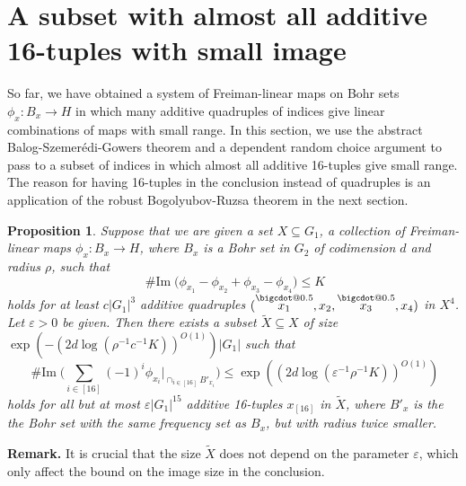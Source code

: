 \documentclass[a4paper,11pt]{article}
\makeatletter
\numberwithin{theorem}{section}
\newtheorem{proposition}[theorem]{Proposition}
\theoremstyle{definition}
\newcommand{\on}[1]{
	\operatorname{#1}
}
\newcommand\range{\on{\# Im}}
\newcommand*\bcdot{\mathpalette\bigcdot@{0.5}}
\newcommand*\bigcdot@[2]{\mathbin{\vcenter{\hbox{\scalebox{#2}{$\m@th#1\bullet$}}}}}
\newcommand{\upd}[1]{\overset{\bcdot}{#1}}
\makeatother
\begin{document}
\section{A subset with almost all additive 16-tuples with small image}\label{almostalladditive16tuplesABSG1}

So far, we have obtained a system of Freiman-linear maps on Bohr sets  $\phi_x : B_x \to H$ in which many additive quadruples of indices give linear combinations of maps with small range. In this section, we use the abstract Balog-Szemer\'edi-Gowers theorem and a dependent random choice argument to pass to a subset of indices in which almost all additive 16-tuples give small range. The reason for having 16-tuples in the conclusion instead of quadruples is an application of the robust Bogolyubov-Ruzsa theorem in the next section.

\begin{proposition}\label{almostalladd16tupleshavesmallimage}
    Suppose that we are given a set $X \subseteq G_1$, a collection of Freiman-linear maps $\phi_x : B_x \to H$, where $B_x$ is a Bohr set in $G_2$ of codimension $d$ and radius $\rho$, such that 
    \[\range\Big(\phi_{x_1} - \phi_{x_2} + \phi_{x_3} - \phi_{x_4}\Big) \leq K\]
    holds for at least $c|G_1|^3$ additive quadruples $(\upd{x_1}, x_2, \upd{x_3}, x_4)$ in $X^4$. Let $\varepsilon > 0$ be given. Then there exists a subset $\tilde{X} \subseteq X$ of size $\exp(-(2d \log ( \rho^{-1}c^{-1} K))^{O(1)})|G_1|$ such that 
    \[\range\Big(\sum_{i \in [16]} (-1)^i \phi_{x_i}\Big|_{\cap_{i \in [16]} B'_{x_i}}\Big) \leq \exp((2 d\log (\varepsilon^{-1} \rho^{-1} K))^{O(1)})\]
    holds for all but at most $\varepsilon |G_1|^{15}$ additive 16-tuples $x_{[16]}$ in $\tilde{X}$, where $B'_x$ is the the Bohr set with the same frequency set as $B_x$, but with radius twice smaller.
\end{proposition}

\textbf{Remark.} It is crucial that the size $\tilde{X}$ does not depend on the parameter $\varepsilon$, which only affect the bound on the image size in the conclusion.
\end{document}
